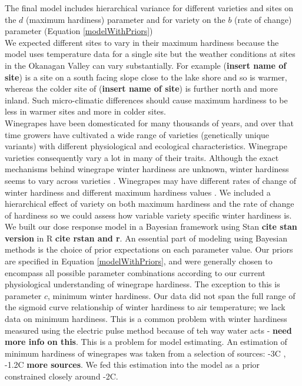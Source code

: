 \documentclass[11pt,letter]{article}
\begin{document}
The final model includes hierarchical variance for different varieties and sites on the $d$ (maximum hardiness) parameter and for variety on the $b$ (rate of change) parameter (Equation \ref{modelWithPriors}) \\

We expected different sites to vary in their maximum hardiness because the model uses temperature data for a single site but the weather conditions at sites in the Okanagan Valley can vary substantially. For example (\textbf{insert name of site}) is a site on a south facing slope close to the lake shore and so is warmer, whereas the colder site of (\textbf{insert name of site}) is further north and more inland. Such micro-climatic differences should cause maximum hardiness to be less in warmer sites and more in colder sites. \\

Winegrapes have been domesticated for many thousands of years, and over that time growers have cultivated a wide range of varieties (genetically unique variants) with different physiological and ecological characteristics. Winegrape varieties consequently vary a lot in many of their traits. Although the exact mechanisms behind winegrape winter hardiness are unknown, winter hardiness seems to vary across varieties \cite{Mills2006,Ferguson2014,Kovaleski2018a}. Winegrapes may have different rates of change of winter hardiness\cite{Kovaleski2018a,Ferguson2014} and different maximum hardiness values \cite{Ferguson2014}. We included a hierarchical effect of variety on both maximum hardiness and the rate of change of hardiness so we could assess how variable variety specific winter hardiness is. \\

We built our dose response model in a Bayesian framework using Stan \textbf{cite stan version} in R \textbf{cite rstan and r}. An essential part of modeling using Bayesian methods is the choice of prior expectations on each parameter value. Our priors are specified in Equation \ref{modelWithPriors}, and were generally chosen to encompass all possible parameter combinations according to our current physiological understanding of winegrape hardiness. The exception to this is parameter $c$, minimum winter hardiness. Our data did not span the full range of the sigmoid curve relationship of winter hardiness to air temperature; we lack data on minimum hardiness. This is a common problem with winter hardiness measured using the electric pulse method because of teh way water acts - \textbf{need more info on this}. This is a problem for model estimating. An estimation of minimum hardiness of winegrapes was taken from a selection of sources: -3\textdegree C \cite{Ferguson2011}, -1.2\textdegree C \cite{Ferguson2014} \textbf{more sources}. We fed this estimation into the model as a prior constrained closely around -2\textdegree C.  
\end{document}

